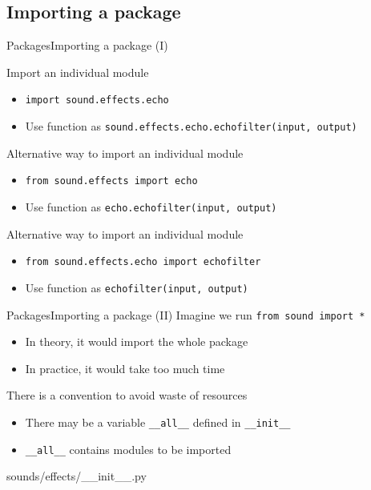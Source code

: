 \documentclass[10pt,compress]{beamer} %
\begin{document}
\subsection{Importing a package}
\begin{frame}{Packages}{Importing a package (I)}
	\\
	\bigskip
	\begin{flushleft}
	Import an individual module
		\begin{itemize}
		\item \texttt{import sound.effects.echo}
		\item Use function as \texttt{sound.effects.echo.echofilter(input, output)}
		\end{itemize}
	Alternative way to import an individual module
		\begin{itemize}
		\item \texttt{from sound.effects import echo}
		\item Use function as \texttt{echo.echofilter(input, output)}
		\end{itemize}
	Alternative way to import an individual module
		\begin{itemize}
		\item \texttt{from sound.effects.echo import echofilter}
		\item Use function as \texttt{echofilter(input, output)}
		\end{itemize}
	\end{flushleft}
\end{frame}

\begin{frame}{Packages}{Importing a package (II)}
	Imagine we run \texttt{from sound import *}
		\begin{itemize}
		\item In theory, it would import the whole package
		\item In practice, it would take too much time
		\end{itemize}
	There is a convention to avoid waste of resources
		\begin{itemize}
		\item There may be a variable \texttt{\_\_all\_\_} defined in \texttt{\_\_init\_\_}
		\item \texttt{\_\_all\_\_} contains modules to be imported
		\end{itemize}

	\begin{block}{sounds/effects/\_\_init\_\_.py}
	\vspace{-0.2cm}
	
	\vspace{-0.2cm}
	\end{block}
\end{frame}
\end{document}
